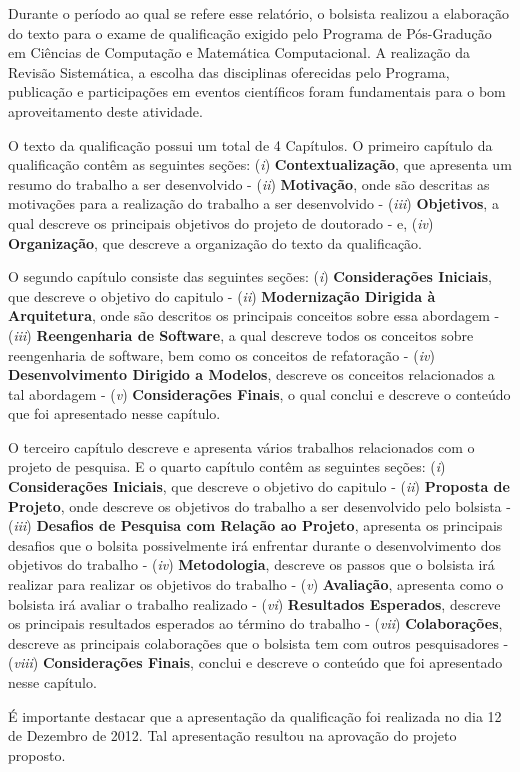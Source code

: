 Durante o período ao qual se refere esse relatório, o bolsista realizou a elaboração do texto para o exame de qualificação exigido pelo Programa de Pós-Gradução em Ciências de Computação e Matemática Computacional. A realização da Revisão Sistemática, a escolha das disciplinas oferecidas pelo Programa, publicação e participações em eventos científicos foram fundamentais para o bom aproveitamento deste atividade.

O texto da qualificação possui um total de 4 Capítulos. O primeiro capítulo da qualificação contêm as seguintes seções: (\textit{i}) \textbf{Contextualização}, que apresenta um resumo do trabalho a ser desenvolvido - (\textit{ii}) \textbf{Motivação}, onde são descritas as motivações para a realização do trabalho a ser desenvolvido - (\textit{iii}) \textbf{Objetivos}, a qual descreve os principais objetivos do projeto de doutorado - e, (\textit{iv}) \textbf{Organização}, que descreve a organização do texto da qualificação. 

O segundo capítulo consiste das seguintes seções: (\textit{i}) \textbf{Considerações Iniciais}, que descreve o objetivo do capitulo - (\textit{ii}) \textbf{Modernização Dirigida à Arquitetura}, onde são descritos os principais conceitos sobre essa abordagem - (\textit{iii}) \textbf{Reengenharia de Software}, a qual descreve todos os conceitos sobre reengenharia de software, bem como os conceitos de refatoração - (\textit{iv}) \textbf{Desenvolvimento Dirigido a Modelos}, descreve os conceitos relacionados a tal abordagem - (\textit{v}) \textbf{Considerações Finais}, o qual conclui e descreve o conteúdo que foi apresentado nesse capítulo. 

O terceiro capítulo descreve e apresenta vários trabalhos relacionados com o projeto de pesquisa. E o quarto capítulo contêm as seguintes seções: (\textit{i}) \textbf{Considerações Iniciais}, que descreve o objetivo do capitulo - (\textit{ii}) \textbf{Proposta de Projeto}, onde descreve os objetivos do trabalho a ser desenvolvido pelo bolsista - (\textit{iii}) \textbf{Desafios de Pesquisa com Relação ao Projeto}, apresenta os principais desafios que o bolsita possivelmente irá enfrentar durante o desenvolvimento dos objetivos do trabalho - (\textit{iv}) \textbf{Metodologia}, descreve os passos que o bolsista irá realizar para realizar os objetivos do trabalho - (\textit{v}) \textbf{Avaliação}, apresenta como o bolsista irá avaliar o trabalho realizado - (\textit{vi}) \textbf{Resultados Esperados}, descreve os principais resultados esperados ao término do trabalho - (\textit{vii}) \textbf{Colaborações}, descreve as principais colaborações que o bolsista tem com outros pesquisadores - (\textit{viii}) \textbf{Considerações Finais}, conclui e descreve o conteúdo que foi apresentado nesse capítulo.

É importante destacar que a apresentação da qualificação foi realizada no dia 12 de Dezembro de 2012. Tal apresentação resultou na aprovação do projeto proposto.